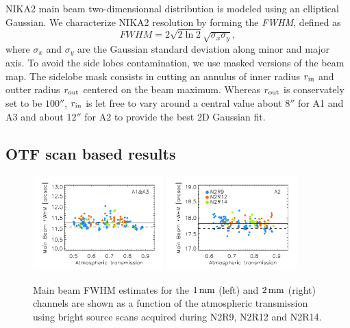 NIKA2 main beam two-dimensionnal distribution is modeled using an
elliptical Gaussian. We characterize NIKA2 resolution by forming the
\emph{FWHM}, defined as
\begin{equation}
  FWHM = 2 \sqrt{2\ln {2}} \sqrt{\sigma_x\sigma_y},
\end{equation}
where $\sigma_x$ and $\sigma_y$ are the Gaussian standard deviation
along minor and major axis.
To avoid the side lobes contamination, we use masked versions of the
beam map. The sidelobe mask consists in cutting an annulus of inner radius
$r_{\rm{in}}$ and outter radius $r_{\rm{out}}$ centered on the beam
maximum. Whereas $r_{\rm{out}}$ is conservately set to be $100''$,
$r_{\rm{in}}$ is let free to vary around a central value about $8''$
for A1 and A3 and about $12''$ for A2 to provide the best 2D Gaussian
fit.

\subsection{OTF scan based results}
\label{se:mb_with_otf}

\begin{figure}[ht!]
\begin{center}
  \includegraphics[clip, width=0.45\textwidth]{Figures/Beams/plot_FWHM_vs_atmtrans_mb_radius_binning2_1mm.pdf}
  \includegraphics[clip, width=0.45\textwidth]{Figures/Beams/plot_FWHM_vs_atmtrans_mb_radius_binning2_a2.pdf}
  \caption[Main Beam FWHM]{Main beam FWHM estimates for the $1\,\rm{mm}$ (left) and $2\,\rm{mm}$ (right) channels are shown as a function of the atmospheric transmission using bright source scans acquired during N2R9, N2R12 and N2R14. }
\label{fig:fwhm_map_atmtrans}
\end{center}
\end{figure}


